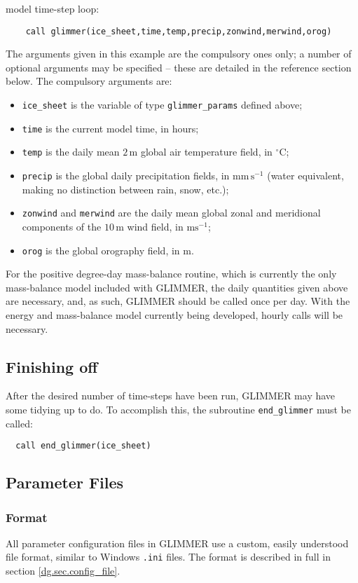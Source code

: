 model time-step loop:
%
\begin{verbatim}
    call glimmer(ice_sheet,time,temp,precip,zonwind,merwind,orog)
\end{verbatim} 
%
The arguments given in this example are the compulsory ones only; a number of
optional arguments may be specified -- these are detailed in the reference
section below. The compulsory arguments are:
%
\begin{itemize}
\item \texttt{ice\_sheet} is the variable of type \texttt{glimmer\_params}
 defined above;
\item \texttt{time} is the current model time, in hours;
\item \texttt{temp} is the daily mean $2\,\mathrm{m}$ global air temperature field, in
  $^{\circ}\mathrm{C}$;
\item \texttt{precip} is the global daily precipitation fields,
  in $\mathrm{mm}\,\mathrm{s}^{-1}$ (water equivalent, making no distinction
  between rain, snow, etc.);
\item \texttt{zonwind} and \texttt{merwind} are the daily mean global zonal and
  meridional components of the $10\,\mathrm{m}$ wind field, in
  $\mathrm{ms}^{-1}$;
\item \texttt{orog} is the global orography field, in $\mathrm{m}$.
\end{itemize}
%
For the positive degree-day mass-balance routine, which is currently the only
mass-balance model included with GLIMMER, the daily quantities given above are
necessary, and, as such, GLIMMER should be called once per day. With the
energy and mass-balance model currently being developed, hourly calls will be
necessary. 
%
\subsection{Finishing off}
%
After the desired number of time-steps have been run, GLIMMER may have some
tidying up to do. To accomplish this, the subroutine \texttt{end\_glimmer}
must be called:
%
\begin{verbatim}
  call end_glimmer(ice_sheet)
\end{verbatim}
%

\subsection{Parameter Files}
\subsubsection{Format}
%
All parameter configuration files in GLIMMER use a custom, easily
understood file format, similar to Windows \texttt{.ini} files. The format is
described in full in section \ref{dg.sec.config_file}. 

